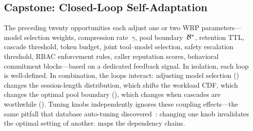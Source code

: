 \subsection{Capstone: Closed-Loop Self-Adaptation}

\begin{opportunity}
\label{opp:self-adapt}
The preceding twenty opportunities each adjust one or two WRP
parameters---model selection weights, compression rate~$\gamma$,
pool boundary~$\mathcal{B}^*$, retention TTL, cascade threshold,
token budget, joint tool--model selection, safety escalation
threshold, RBAC enforcement rules, caller reputation scores,
behavioral commitment blocks---based on a dedicated feedback signal.  In isolation, each loop is well-defined.  In
combination, the loops interact: adjusting model selection
() changes the session-length
distribution, which shifts the workload CDF, which changes the
optimal pool boundary (), which changes
when cascades are worthwhile ().  Tuning
knobs independently ignores these coupling effects---the same
pitfall that database auto-tuning
discovered~\cite{onlinetune2022}: changing one knob invalidates the
optimal setting of another.
 maps the dependency chains.

\begin{figure}[t]
\centering
{}
\end{figure}
\end{opportunity}
